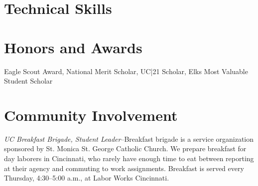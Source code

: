 \documentclass[10pt,letterpaper,roman]{moderncv}	%
\begin{document}

\section{Technical Skills}

\section{Honors and Awards}
Eagle Scout Award, National Merit Scholar, UC|21 Scholar, Elks Most Valuable Student Scholar

\section{Community Involvement}
\emph{UC Breakfast Brigade, Student Leader}--Breakfast brigade is a service organization sponsored by St. Monica St. George Catholic Church. We prepare breakfast for day laborers in Cincinnati, who rarely have enough time to eat between reporting at their agency and commuting to work assignments. Breakfast is served every Thursday, 4:30--5:00 a.m., at Labor Works Cincinnati.
\\
\\

\end{document}
